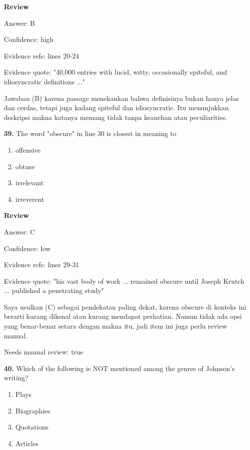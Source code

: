 \documentclass[12pt]{article}
\begin{document}
\par
\begingroup
\setlength{\parskip}{0pt}
\setlength{\parindent}{0pt}
\textbf{Review}\par
Answer: B\par
Confidence: high\par
Evidence refs: lines 20-24\par
Evidence quote: "40,000 entries with lucid, witty, occasionally spiteful, and idiosyncratic definitions ..."\par
Jawaban (B) karena passage menekankan bahwa definisinya bukan hanya jelas dan cerdas, tetapi juga kadang spiteful dan idiosyncratic. Itu menunjukkan deskripsi makna katanya memang tidak tanpa keanehan atau peculiarities.\par
\endgroup
\par
\vspace{0.25\baselineskip}
\noindent\textbf{39.} The word "obscure" in line 30 is closest in meaning to
\begin{enumerate}[label=(\Alph*),leftmargin=*,itemsep=0.2em]
\item offensive
\item obtuse
\item irrelevant
\item irreverent
\end{enumerate}
\par
\begingroup
\setlength{\parskip}{0pt}
\setlength{\parindent}{0pt}
\textbf{Review}\par
Answer: C\par
Confidence: low\par
Evidence refs: lines 29-31\par
Evidence quote: "his vast body of work ... remained obscure until Joseph Krutch ... published a penetrating study"\par
Saya usulkan (C) sebagai pendekatan paling dekat, karena obscure di konteks ini berarti kurang dikenal atau kurang mendapat perhatian. Namun tidak ada opsi yang benar-benar setara dengan makna itu, jadi item ini juga perlu review manual.\par
Needs manual review: true\par
\endgroup
\par
\vspace{0.25\baselineskip}
\noindent\textbf{40.} Which of the following is NOT mentioned among the genres of Johnson's writing?
\begin{enumerate}[label=(\Alph*),leftmargin=*,itemsep=0.2em]
\item Plays
\item Biographies
\item Quotations
\item Articles
\end{enumerate}
\end{document}
